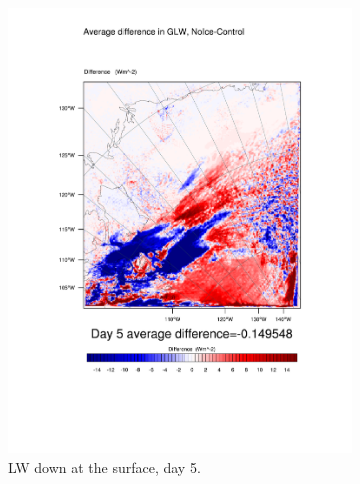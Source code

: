 \begin{figure}
	\begin{subfigure}{0.48\textwidth}
		\centering
		\includegraphics[width=\textwidth]{results/noice/diff_NoIce_GLW_Day5.pdf}
		\caption{LW down at the surface, day 5.}
		\label{subfig:glw_r2Day5}
	\end{subfigure}
	\quad
	\begin{subfigure}{0.48\textwidth}
		\centering

\end{subfigure}
\end{figure}
